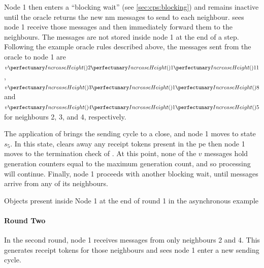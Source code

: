 Node 1 then enters a ``blocking wait'' (see \cref{sec:cps:blocking}) and remains inactive until the oracle returns the new \gls{nm} messages to send to each neighbour.   sees node 1 receive those messages and then immediately forward them to the neighbours.  The messages are not stored inside node 1 at the end of a step.  Following the example oracle rules described above, the messages sent from the oracle to node 1 are \(\cpvv{2}{1}{11}\), \(\cpvv{3}{1}{8}\) and \(\cpvv{4}{1}{5}\) for neighbours 2, 3, and 4, respectively.

The application of  brings the sending cycle to a close, and node 1 moves to state \(s_5\).  In this state,  clears away any receipt tokens present in the \gls{pe} then node 1 moves to the termination check of .  At this point, none of the \(v\) messages hold generation counters equal to the maximum generation count, and so processing will continue.  Finally, node 1 proceeds with another blocking wait, until messages arrive from any of its neighbours.

\begin{cpobjectsfloat}
\begin{cpobjects}
\end{cpobjects}
\caption{\label{objs:nmp:ex1}Objects present inside Node 1 at the end of round 1 in the asynchronous  example}
\end{cpobjectsfloat}

\paragraph{Round Two}
In the second round, node 1 receives messages from only neighbours 2 and 4. This generates receipt tokens for those neighbours and sees node 1 enter a new sending cycle.

